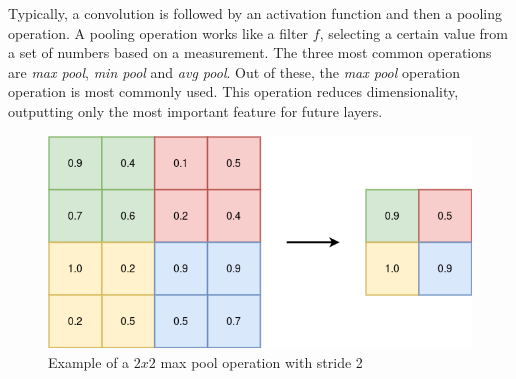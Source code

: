 Typically, a convolution is followed by an activation function and then a pooling operation. A pooling operation works like a filter $f$, selecting a certain value from a set of numbers based on a measurement. The three most common operations are \textit{max pool}, \textit{min pool} and \textit{avg pool}. Out of these, the \textit{max pool} operation operation is most commonly used. This operation reduces dimensionality, outputting only the most important feature for future layers. \\


\begin{figure}[h]
    \centering
    \includegraphics[scale=0.4]{figures/pooling.png}
    \caption{Example of a $2 x 2$ max pool operation with stride 2}
    \label{fig:maxpool}
\end{figure}